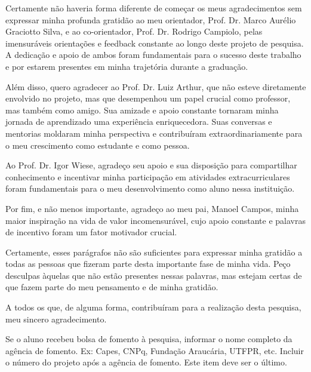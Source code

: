 
\begin{agradecimentos}%

Certamente não haveria forma diferente de começar os meus agradecimentos sem expressar minha profunda gratidão ao meu orientador, Prof. Dr. Marco Aurélio Graciotto Silva, e ao co-orientador, Prof. Dr. Rodrigo Campiolo, pelas imensuráveis orientações e feedback constante ao longo deste projeto de pesquisa. A dedicação e apoio de ambos foram fundamentais para o sucesso deste trabalho e por estarem presentes em minha trajetória durante a graduação.

Além disso, quero agradecer ao Prof. Dr. Luiz Arthur, que não esteve diretamente envolvido no projeto, mas que desempenhou um papel crucial como professor, mas também como amigo. Sua amizade e apoio constante tornaram minha jornada de aprendizado uma experiência enriquecedora. Suas conversas e mentorias moldaram minha perspectiva e contribuíram extraordinariamente para o meu crescimento como estudante e como pessoa.

Ao Prof. Dr. Igor Wiese, agradeço seu apoio e sua disposição para compartilhar conhecimento e incentivar minha participação em atividades extracurriculares foram fundamentais para o meu desenvolvimento como aluno nessa instituição.

Por fim, e não menos importante, agradeço ao meu pai, Manoel Campos, minha maior inspiração na vida de valor incomensurável, cujo apoio constante e palavras de incentivo foram um fator motivador crucial.

Certamente, esses parágrafos não são suficientes para expressar minha gratidão a todas as pessoas que fizeram parte desta importante fase de minha vida. Peço desculpas àquelas que não estão presentes nessas palavras, mas estejam certas de que fazem parte do meu pensamento e de minha gratidão.

A todos os que, de alguma forma, contribuíram para a realização desta pesquisa, meu sincero agradecimento.


Se o aluno recebeu bolsa de fomento à pesquisa, informar o nome completo da agência de fomento. Ex: Capes, CNPq, Fundação Araucária, UTFPR, etc. Incluir o número do projeto após a agência de fomento. Este item deve ser o último.

\end{agradecimentos}

